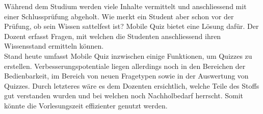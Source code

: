 

Während dem Studium werden viele Inhalte vermittelt und anschliessend mit einer Schlussprüfung abgeholt. Wie merkt ein Student aber schon vor der Prüfung, ob sein Wissen sattelfest ist? Mobile Quiz bietet eine Lösung dafür. Der Dozent erfasst Fragen, mit welchen die Studenten anschliessend ihren Wissensstand ermitteln können. \\
Stand heute umfasst Mobile Quiz inzwischen einige Funktionen, um Quizzes zu erstellen. Verbesserungspotentiale liegen allerdings noch in den Bereichen der Bedienbarkeit, im Bereich von neuen Fragetypen sowie in der Auswertung von Quizzes. Durch letzteres wäre es dem Dozenten ersichtlich, welche Teile des Stoffs gut verstanden wurden und bei welchen noch Nachholbedarf herrscht. Somit könnte die Vorlesungszeit effizienter genutzt werden.
\\
\\
